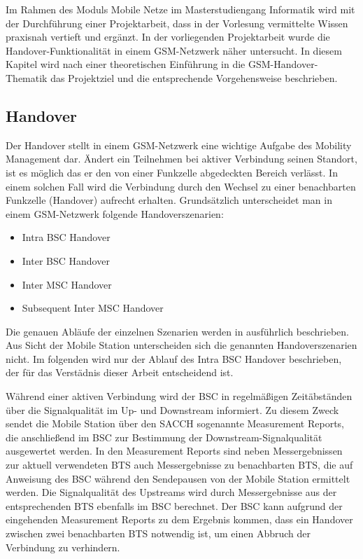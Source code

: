 
Im Rahmen des Moduls Mobile Netze im Masterstudiengang Informatik wird mit der Durchführung einer Projektarbeit, dass in der Vorlesung vermittelte Wissen praxisnah vertieft und  ergänzt. In der vorliegenden Projektarbeit wurde die Handover-Funktionalität in einem GSM-Netzwerk näher untersucht. In diesem Kapitel wird nach einer theoretischen Einführung in die GSM-Handover-Thematik das Projektziel und die entsprechende Vorgehensweise beschrieben.

\subsection{Handover}\label{sec:handover}

Der Handover stellt in einem GSM-Netzwerk eine wichtige Aufgabe des Mobility Management dar. Ändert ein Teilnehmen bei aktiver Verbindung seinen Standort, ist es möglich das er den von einer Funkzelle abgedeckten Bereich verlässt. In einem solchen Fall wird die Verbindung durch den Wechsel zu einer benachbarten Funkzelle (Handover) aufrecht erhalten. Grundsätzlich unterscheidet man in einem GSM-Netzwerk folgende Handoverszenarien:

\begin{itemize}
 \item Intra BSC Handover
 \item Inter BSC Handover
 \item Inter MSC Handover
 \item Subsequent Inter MSC Handover
\end{itemize}

Die genauen Abläufe der einzelnen Szenarien werden in \cite{bib:grundkursmks} ausführlich beschrieben. Aus Sicht der Mobile Station unterscheiden sich die genannten Handoverszenarien nicht. Im folgenden wird nur der Ablauf des Intra BSC Handover beschrieben, der für das Verstädnis dieser Arbeit entscheidend ist.

Während einer aktiven Verbindung wird der BSC in regelmäßigen Zeitäbständen über die Signalqualität im Up- und Downstream informiert. Zu diesem Zweck sendet die Mobile Station über den SACCH sogenannte Measurement Reports, die anschließend im BSC zur Bestimmung der Downstream-Signalqualität ausgewertet werden. In den Measurement Reports sind neben Messergebnissen zur aktuell verwendeten BTS auch Messergebnisse zu benachbarten BTS, die auf Anweisung des BSC während den Sendepausen von der Mobile Station ermittelt werden. Die Signalqualität des Upstreams wird durch Messergebnisse aus der entsprechenden BTS ebenfalls im BSC berechnet. Der BSC kann aufgrund der eingehenden Measurement Reports zu dem Ergebnis kommen, dass ein Handover zwischen zwei benachbarten BTS notwendig ist, um einen Abbruch der Verbindung zu verhindern.

